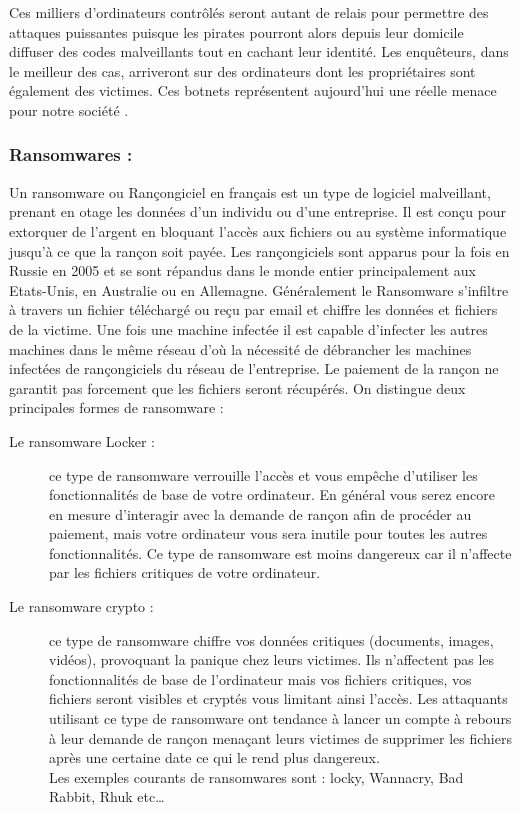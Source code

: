 Ces milliers d’ordinateurs contrôlés seront autant de relais pour permettre des attaques puissantes puisque les pirates pourront alors depuis leur domicile diffuser des codes malveillants tout en cachant leur identité. Les enquêteurs, dans le meilleur des cas, arriveront sur des ordinateurs dont les propriétaires sont également des victimes. Ces botnets représentent aujourd’hui une réelle menace pour notre société \cite{ref13}.
\subsubsection{Ransomwares : }
Un ransomware ou Rançongiciel en français est un type de logiciel malveillant, prenant en otage les données d'un individu ou d'une entreprise. Il est conçu pour extorquer de l'argent en bloquant l'accès aux fichiers ou au système informatique jusqu'à ce que la rançon soit payée. Les rançongiciels sont apparus pour la fois en Russie en 2005 \cite{ref13} et se sont répandus dans le monde entier principalement aux Etats-Unis, en Australie ou en Allemagne. Généralement le Ransomware s’infiltre à travers un fichier téléchargé ou reçu par email et chiffre les données et fichiers de la victime. Une fois une machine infectée il est capable d’infecter les autres machines dans le même réseau d’où la nécessité de débrancher les machines infectées de rançongiciels du réseau de l’entreprise.
Le paiement de la rançon ne garantit pas forcement que les fichiers seront récupérés. On distingue deux principales formes de ransomware :
\begin{description}
 \item[Le ransomware Locker : ] ce type de ransomware verrouille l’accès et vous empêche d’utiliser les fonctionnalités de base de votre ordinateur. En général vous serez encore en mesure d’interagir avec la demande de rançon afin de procéder au paiement, mais votre ordinateur vous sera inutile pour toutes les autres fonctionnalités. Ce type de ransomware est moins dangereux car il n’affecte par les fichiers critiques de votre ordinateur.
 \item[Le ransomware crypto : ]  ce type de ransomware chiffre vos données critiques (documents, images, vidéos), provoquant la panique chez leurs victimes. Ils n’affectent pas les fonctionnalités de base de l’ordinateur mais vos fichiers critiques, vos fichiers seront visibles et cryptés vous limitant ainsi l’accès. Les attaquants utilisant ce type de ransomware ont tendance à lancer un compte à rebours à leur demande de rançon menaçant leurs victimes de supprimer les fichiers après une certaine date ce qui le rend plus dangereux.\\
Les exemples courants de ransomwares sont : locky, Wannacry, Bad Rabbit, Rhuk etc…
 \end{description} 
